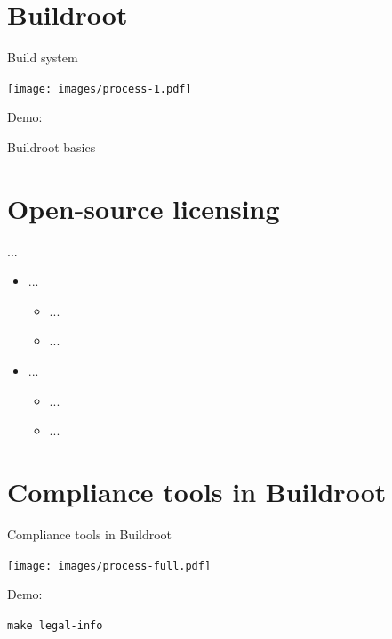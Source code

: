 \documentclass[xetex,table]{beamer}
\begin{document}
\section{Buildroot}

\begin{frame}{Build system}
  \begin{center}
    \texttt{[image: images/process-1.pdf]}
  \end{center}
\end{frame}

\begin{frame}[standout]
  Demo:

  Buildroot basics
\end{frame}


\section{Open-source licensing}

\begin{frame}{...}
  \begin{itemize}
  \item ...
    \begin{itemize}
    \item ...
    \item ...
    \end{itemize}
  \item ...
    \begin{itemize}
    \item ...
    \item ...
    \end{itemize}
  \end{itemize}
\end{frame}


\section{Compliance tools in Buildroot}

\begin{frame}{Compliance tools in Buildroot}
  \begin{center}
    \texttt{[image: images/process-full.pdf]}
  \end{center}
\end{frame}

\begin{frame}[standout]
  Demo:

  {\tt make legal-info}
\end{frame}
\end{document}
